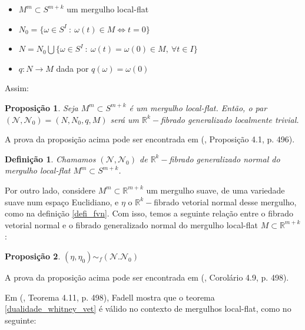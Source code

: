 \documentclass[12pt,oneside]{book} %
\newtheorem{defi}   {\hspace{0.5cm}Defini\c c\~ao}[chapter]
\newtheorem{prop}   {\hspace{0.5cm}Proposi\c c\~ao}[chapter]
\newcommand{\R}{\mathbb{R}}
\begin{document}
\begin{itemize}
	\item $M^{m}\subset S^{m+k}$ um mergulho local-flat
	\item $N_{0}=\{ \omega\in S^{I} \ : \ \omega(t)\in M \Leftrightarrow t=0 \}$
	\item $N=N_{0}\bigcup \{ \omega\in S^{I} \ : \ \omega(t)=\omega(0)\in M, \ \forall t\in I \}$
	\item $q:N\to M$ dada por $q(\omega)=\omega(0)$
\end{itemize}

\par Assim:

\begin{prop}
	Seja $M^{m}\subset S^{m+k}$ é um mergulho local-flat. Então, o par $(\mathcal{N},\mathcal{N}_{0})=(N,N_{0},q,M)$ será um $\R^{k}-$fibrado generalizado localmente trivial.
\end{prop}

\par A prova da proposição acima pode ser encontrada em (\cite{fadell_1}, Proposição 4.1, p. 496).

\begin{defi}
	Chamamos $(\mathcal{N},\mathcal{N}_{0})$ de $\R^{k}-$fibrado generalizado normal do mergulho local-flat $M^{m}\subset S^{m+k}$.
\end{defi}

\par Por outro lado, considere $M^{m}\subset\R^{m+k}$ um mergulho suave, de uma variedade suave num espaço Euclidiano, e $\eta$ o $\R^{k}-$fibrado vetorial normal desse mergulho, como na definição \ref{defi_fvn}. Com isso, temos a seguinte relação entre o fibrado vetorial normal e o fibrado generalizado normal do mergulho local-flat $M\subset \R^{m+k}$:

\begin{prop}
	$(\eta,\eta_{0})\sim_{f} (\mathcal{N}.\mathcal{N}_{0})$
\end{prop}

\par A prova da proposição acima pode ser encontrada em (\cite{fadell_1}, Corolário 4.9, p. 498).

\par Em (\cite{fadell_1}, Teorema 4.11, p. 498), Fadell mostra que o teorema \ref{dualidade_whitney_vet} é válido no contexto de mergulhos local-flat, como no seguinte:
\end{document}
